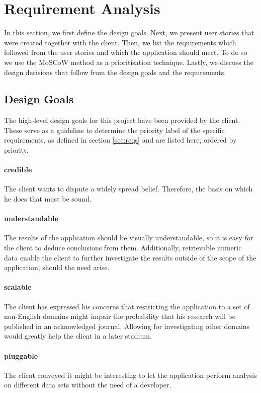 \section {Requirement Analysis}
In this section, we first define the design goals. Next, we present user stories that were created together with the client. Then, we list the requirements which followed from the user stories and which the application should meet. To do so we use the MoSCoW method\cite{clegg1994case} as a prioritisation technique. Lastly, we discuss the design decisions that follow from the design goals and the requirements.

\subsection{Design Goals}
The high-level design goals for this project have been provided by the client. These serve as a guideline to determine the priority label of the specific requirements, as defined in section \ref{sec:reqs} and are listed here, ordered by priority.

\paragraph{credible} The client wants to dispute a widely spread belief. Therefore, the basis on which he does that must be sound.
\paragraph{understandable} The results of the application should be visually understandable, so it is easy for the client to deduce conclusions from them. Additionally, retrievable numeric data enable the client to further investigate the results outside of the scope of the application, should the need arise.
\paragraph{scalable} The client has expressed his concerns that restricting the application to a set of non-English domains might impair the probability that his research will be published in an acknowledged journal. Allowing for investigating other domains would greatly help the client in a later stadium.
\paragraph{pluggable} The client conveyed it might be interesting to let the application perform analysis on different data sets without the need of a developer. 
